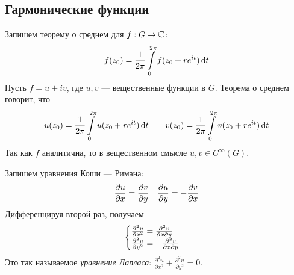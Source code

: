 \documentclass[a4paper]{report}
\begin{document}
    \subsection{Гармонические функции}
    Запишем теорему о среднем для $f: G \rightarrow \mathbb{C}$:
    \[f(z_0) = \frac 1{2\pi} \int\limits_{0}^{2\pi}f(z_0 + r e^{it})\operatorname{d}\! t\]
    Пусть $f = u + iv$, где $u, v$ --- вещественные функции в $G$.
    Теорема о среднем говорит, что
    \[u(z_0) = \frac 1{2\pi} \int\limits_{0}^{2\pi}u(z_0 + r e^{it})\operatorname{d}\! t \qquad v(z_0) = \frac 1{2\pi}\int\limits_{0}^{2\pi}v(z_0 + r e^{it})\operatorname{d}\! t\]
    Так как $f$ аналитична, то в вещественном смысле $u, v \in C^{\infty}(G)$.

    Запишем уравнения Коши --- Римана:
    \[\frac{\partial u}{\partial x} = \frac{\partial v}{\partial y} \quad \frac{\partial u}{\partial y} = -\frac{\partial v}{\partial x}\]
    Дифференцируя второй раз, получаем \[\begin{cases}\frac{\partial^2 u}{\partial x^2} = \frac{\partial^2 v}{\partial x \partial y} \\ \frac{\partial^2 u}{\partial y^2} = -\frac{\partial^2 v}{\partial x \partial y}\end{cases}\]
    Это так называемое \emph{уравнение Лапласа}: $\frac{\partial^2 u}{\partial x^2} + \frac{\partial^2 u}{\partial y^2} = 0$.
\end{document}
